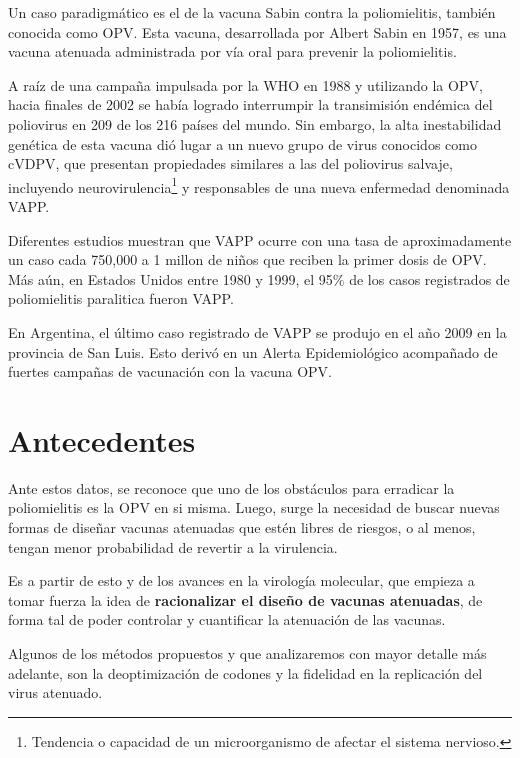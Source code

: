 Un caso paradigm\'atico es el de la vacuna Sabin contra la poliomielitis,
tambi\'en conocida como \ac{OPV}. Esta vacuna, desarrollada por Albert Sabin en
1957, es una vacuna atenuada administrada por v\'ia oral para prevenir la
poliomielitis. 

A ra\'iz de una campa\~na impulsada por la \ac{WHO} en 1988 y utilizando la
\ac{OPV}, hacia finales de 2002 se hab\'ia logrado interrumpir la
transimisi\'on end\'emica del poliovirus en 209 de los 216 pa\'ises del
mundo\cite{Aylward04}. Sin embargo, la alta inestabilidad gen\'etica de esta
vacuna di\'o lugar a un nuevo grupo de virus conocidos como \ac{cVDPV}, que
presentan propiedades similares a las del poliovirus salvaje, incluyendo
neurovirulencia\footnote{Tendencia o capacidad de un microorganismo de afectar
el sistema nervioso.} y responsables de una nueva enfermedad denominada
\ac{VAPP}. 

Diferentes estudios muestran que \ac{VAPP} ocurre con una tasa de
aproximadamente un caso cada 750,000 a 1 millon de ni\~nos que reciben la
primer dosis de \ac{OPV}\cite{Aylward04}. M\'as a\'un, en Estados Unidos entre
1980 y 1999, el 95\% de los casos registrados de poliomielitis paralitica fueron
\ac{VAPP}\cite{DeJesus07}.

En Argentina, el \'ultimo caso registrado de \ac{VAPP} se produjo en el a\~no
2009 en la provincia de San Luis\cite{msal09}. Esto deriv\'o en un Alerta
Epidemiol\'ogico acompa\~nado de fuertes campa\~nas de vacunaci\'on con la
vacuna \ac{OPV}.

\section{Antecedentes}
\label{antecedentes}
Ante estos datos, se reconoce que uno de los obst\'aculos para erradicar la
poliomielitis es la \ac{OPV} en si misma\cite{Chumakov08}. Luego, surge la
necesidad de buscar nuevas formas de dise\~nar vacunas atenuadas que est\'en
libres de riesgos, o al menos, tengan menor probabilidad de revertir a la
virulencia.

Es a partir de esto y de los avances en la virolog\'ia molecular, que empieza
a tomar fuerza la idea de \textbf{racionalizar el dise\~no de vacunas
atenuadas}, de forma tal de poder controlar y cuantificar la atenuaci\'on de las
vacunas\cite{Lauring10}.

Algunos de los m\'etodos propuestos y que analizaremos con mayor detalle m\'as
adelante, son la deoptimizaci\'on  de codones\cite{Coleman08} y la fidelidad en
la replicaci\'on del virus atenuado\cite{Vignuzzi08}.

